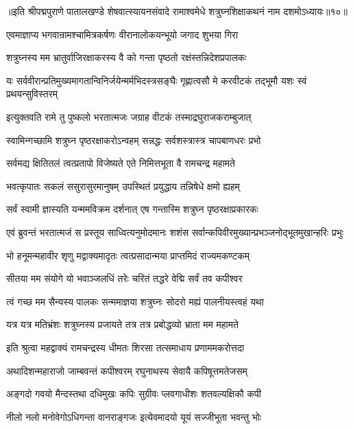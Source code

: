 {॥इति श्रीपद्मपुराणे पातालखण्डे शेषवात्स्यायनसंवादे रामाश्वमेधे शत्रुघ्नशिक्षाकथनं नाम दशमोऽध्यायः॥१०॥}



\twolineshloka
{एवमाज्ञाप्य भगवान्रामश्चामित्रकर्षणः}
{वीरानालोकयन्भूयो जगाद शुभया गिरा}%

\twolineshloka
{शत्रुघ्नस्य मम भ्रातुर्वाजिरक्षाकरस्य वै}
{को गन्ता पृष्ठतो रक्षंस्तन्निदेशप्रपालकः}%

\twolineshloka
{यः सर्ववीरान्प्रतिमुख्यमागतान्विनिर्जयेन्मर्मभिदस्त्रसङ्घैः}
{गृह्णात्वसौ मे करवीटकं तद्भूमौ यशः स्वं प्रथयन्सुविस्तरम्}%

\twolineshloka
{इत्युक्तवति रामे तु पुष्कलो भरतात्मजः}
{जग्राह वीटकं तस्माद्रघुराजकराम्बुजात्}%

\twolineshloka
{स्वामिन्गच्छामि शत्रुघ्न पृष्ठरक्षाकरोऽन्वहम्}
{सन्नद्धः सर्वशस्त्रास्त्र चापबाणधरः प्रभो}%

\twolineshloka
{सर्वमद्य क्षितितलं त्वत्प्रतापो विजेष्यते}
{एते निमित्तभूता वै रामचन्द्र महामते}%

\twolineshloka
{भवत्कृपातः सकलं ससुरासुरमानुषम्}
{उपस्थितं प्रयुद्धाय तन्निषेधे क्षमो ह्यहम्}%

\twolineshloka
{सर्वं स्वामी ज्ञास्यति यन्ममविक्रम दर्शनात्}
{एष गन्तास्मि शत्रुघ्न पृष्ठरक्षाप्रकारकः}%

\twolineshloka
{एवं ब्रुवन्तं भरतात्मजं स प्रस्तूय साध्वित्यनुमोदमानः}
{शशंस सर्वान्कपिवीरमुख्यान्प्रभञ्जनोद्भूतमुखान्हरिः प्रभुः}%

\twolineshloka
{भो हनूमन्महावीर शृणु मद्वाक्यमादृतः}
{त्वत्प्रसादान्मया प्राप्तमिदं राज्यमकण्टकम्}%

\twolineshloka
{सीतया मम संयोगे यो भवाञ्जलधिं तरेः}
{चरितं तद्धरे वेद्मि सर्वं तव कपीश्वर}%

\twolineshloka
{त्वं गच्छ मम सैन्यस्य पालकः सन्ममाज्ञया}
{शत्रुघ्नः सोदरो मह्यं पालनीयस्त्वहं यथा}%

\twolineshloka
{यत्र यत्र मतिभ्रंशः शत्रुघ्नस्य प्रजायते}
{तत्र तत्र प्रबोद्धव्यो भ्राता मम महामते}%

\twolineshloka
{इति श्रुत्वा महद्वाक्यं रामचन्द्रस्य धीमतः}
{शिरसा तत्समाधाय प्रणाममकरोत्तदा}%

\twolineshloka
{अथादिशन्महाराजो जाम्बवन्तं कपीश्वरम्}
{रघुनाथस्य सेवायै कपिषूत्तमतेजसम्}%

\twolineshloka
{अङ्गदो गवयो मैन्दस्तथा दधिमुखः कपिः}
{सुग्रीवः प्लवगाधीशः शतवल्यक्षिकौ कपी}%

\twolineshloka
{नीलो नलो मनोवेगोऽधिगन्ता वानराङ्गजः}
{इत्येवमादयो यूयं सज्जीभूता भवन्तु भोः}%

